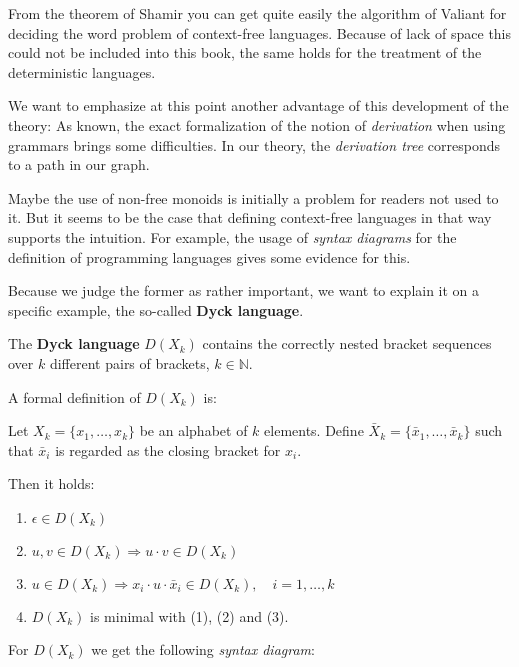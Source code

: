 From the theorem of Shamir you can get quite easily the algorithm of Valiant for
deciding the word problem of context-free languages. Because of lack of space
this could not be included into this book, the same holds for the treatment of
the  deterministic languages.

We want to emphasize at this point another advantage of this development of the
theory: As known, the exact formalization of the notion of {\em derivation}
when using grammars brings some difficulties. In our theory, the {\em derivation
tree} corresponds to a path in our graph.

Maybe the use of non-free monoids is initially a problem for readers not used to
it. But it seems to be the case that defining context-free
languages in that way supports the intuition. For example, the usage of
{\em syntax diagrams} for the definition of programming languages gives some
evidence for this.

Because we judge the former as rather important, we want to explain it on a
specific example, the so-called {\bf Dyck language}.


The {\bf Dyck language} $D(X_k)$ contains the correctly nested bracket sequences
over $k$ different pairs of brackets, $k \in \mathbb{N}$.

A formal definition of $D(X_k)$ is:

Let $X_k = \{ x_1, \ldots, x_k \}$ be an alphabet of $k$ elements. Define
$\bar{X}_k = \{ \bar{x}_1, \ldots, \bar{x}_k \}$ such that $\bar{x}_i$ is regarded 
as the closing bracket for $x_i$.

Then it holds:
\begin{enumerate}
  \item $\epsilon \in D(X_k)$
  \item $u, v \in D(X_k) \Rightarrow u \cdot v \in D(X_k)$
  \item $u \in D(X_k) \Rightarrow x_i \cdot u \cdot \bar{x}_i \in D(X_k),\quad i
  = 1, \ldots, k$
  \item $D(X_k)$ is minimal with (1), (2) and (3). 
\end{enumerate}

For $D(X_k)$ we get the following {\em syntax diagram}:

